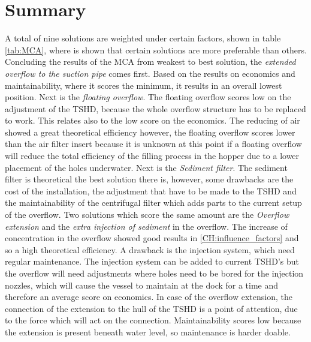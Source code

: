 \section{Summary}
A total of nine solutions are weighted under certain factors, shown in table \ref{tab:MCA}, where is shown that certain solutions are more preferable than others. Concluding the results of the MCA from weakest to best solution, the \textit{extended overflow to the suction pipe} comes first. Based on the results on economics and maintainability, where it scores the minimum, it results in an overall lowest position. \newline
Next is the \textit{floating overflow}. The floating overflow scores low on the adjustment of the TSHD, because the whole overflow structure has to be replaced to work. This relates also to the low score on the economics. The reducing of air showed a great theoretical efficiency however, the floating overflow scores lower than the air filter insert because it is unknown at this point if a floating overflow will reduce the total efficiency of the filling process in the hopper due to a lower placement of the holes underwater.\newline 
Next is the \textit{Sediment filter}. The sediment filter is theoretical the best solution there is, however, some drawbacks are the cost of the installation, the adjustment that have to be made to the TSHD and the maintainability of the centrifugal filter which adds parts to the current setup of the overflow. \newline
Two solutions which score the same amount are the \textit{Overflow extension} and the \textit{extra injection of sediment} in the overflow. The increase of concentration in the overflow showed good results in \ref{CH:influence_factors} and so a high theoretical efficiency. A drawback is the injection system, which need regular maintenance. The injection system can be added to current TSHD's but the overflow will need adjustments where holes need to be bored for the injection nozzles, which will cause the vessel to maintain at the dock for a time and therefore an average score on economics. In case of the overflow extension, the connection of the extension to the hull of the TSHD is a point of attention, due to the force which will act on the connection. Maintainability scores low because the extension is present beneath water level, so maintenance is harder doable.\newline
